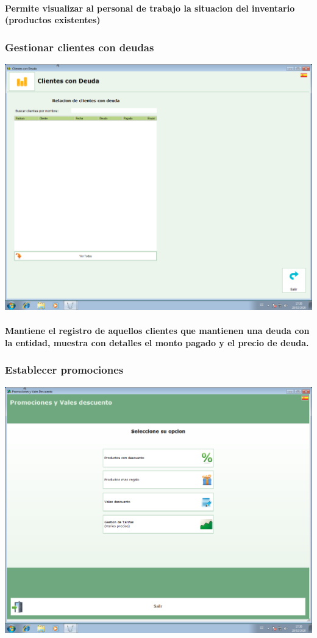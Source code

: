 \documentclass[12pt,a4paper]{ articule }
\begin{document}
\paragraph{Permite visualizar al personal de trabajo la situacion del inventario (productos existentes)} 

\subsubsection*{Gestionar clientes con deudas}
\includegraphics[scale=0.35]{Clientes con deuda.png} 
\paragraph{Mantiene el registro de aquellos clientes que mantienen una deuda con la entidad, muestra con detalles el monto pagado y el precio de deuda.}

\subsubsection*{Establecer promociones}
\includegraphics[scale=0.35]{Promociones.png} 
\end{document}
